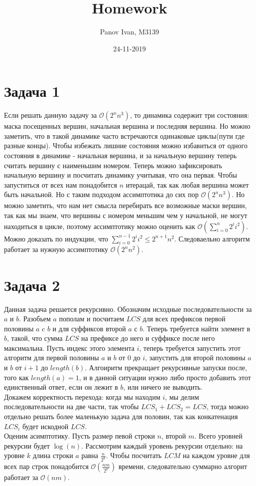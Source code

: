\documentclass{article}
\title{Homework}
\date{24-11-2019}
\author{Panov Ivan, M3139}
\begin{document}
	
	\maketitle
	\newpage
	
	\section*{Задача 1}
	Если решать данную задачу за $\mathcal{O}(2^nn^3)$, то динамика содержит три состояния: маска посещенных вершин, начальная вершина и последняя вершина. Но можно заметить, что в такой динамике часто встречаются одинаковые циклы(пути где разные концы). Чтобы избежать лишние состояния можно избавиться от одного состояния в динамике - начальная вершина, и за начальную вершину теперь считать вершину с наименьшим номером. Теперь можно зафиксировать начальную вершину и посчитать динамику учитывая, что она первая. Чтобы запуститься от всех нам понадобится $n$ итерацай, так как любая вершина может быть начальной. Но с таким подходом ассимптотика до сих пор  $\mathcal{O}(2^nn^3)$. Но можно заметить, что нам нет смысла перебирать все возможные маски вершин, так как мы знаем, что вершины с номером меньшим чем у начальной, не могут находиться в цикле, поэтому ассимптотику можно оценить как $\mathcal{O}(\sum_{i = 0}^{n}2^ii^2)$. Можно доказать по индукции, что $\sum_{i = 0}^{n - 1}2^ii^2 \leq 2^{n + 1}n^2$. Следоваельно алгоритм работает за нужную ассимптотику $\mathcal{O}(2^nn^2)$.
	
	\section*{Задача 2}
	Данная задача решается рекурсивно. Обозначим исходные последовательности за $a$ и $b$. Разобьем $a$ пополам и посчитаем $LCS$ для	всех префиксов первой половины $a$ c $b$ и для суффиксов второй $a$ с $b$. Теперь требуется найти элемент в $b$, такой, что сумма $LCS$ на префиксе до него и суффиксе после него максимальна. Пусть индекс этого элемента $i$, теперь требуется запустить этот алгоритм для первой половины $a$ и $b$ от $0$ до $i$, запустить для второй половины $a$ и $b$ от $i + 1$ до $length(b)$. Алгоиритм прекращает рекурсивные запуски после, того как $length(a) = 1$, и в данной ситуации нужно либо просто добавить этот единственный ответ, если он лежит в $b$, или ничего не выводить.
	\\
	Докажем корректность перехода: когда мы находим $i$, мы делим последовательности на две части, так чтобы $LCS_1 + LCS_2 = LCS$, тогда можно отдельно решать более маленькую задача для половин, так как конкатенация $LCS_i$ будет искодной $LCS$.
	\\
	Оценим асимптотику. Пусть размер певой строки $n$, второй $m$. Всего уровней рекурсии будет $\log(n)$. Рассмотрим каждый уровень рекурсии отдельно: на уровне $k$ длина строки $a$ равна $\frac{n}{2^k}$. Чтобы посчитать $LCM$ на каждом уровне для всех пар строк понадобится $\mathcal{O}(\frac{nm}{2^k})$ времени, следовательно суммарно алгорит работает за $\mathcal{O}(nm)$.
	
\end{document}
